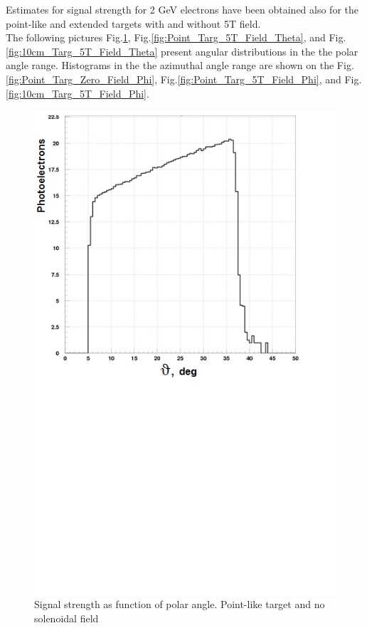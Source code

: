 Estimates for signal strength for 2 GeV electrons have been obtained also for the point-like and extended targets with and without 5T field.\\
\indent The following pictures 
Fig.\ref{fig:Point_Targ_Zero_Field_Theta}, 
Fig.\ref{fig:Point_Targ_5T_Field_Theta}, and 
Fig.\ref{fig:10cm_Targ_5T_Field_Theta} 
present angular distributions in the the polar angle range. Histograms  in the the azimuthal angle range are shown on the 
Fig.\ref{fig:Point_Targ_Zero_Field_Phi}, 
Fig.\ref{fig:Point_Targ_5T_Field_Phi}, and 
Fig.\ref{fig:10cm_Targ_5T_Field_Phi}. 

\begin{figure}[!h]
    \centering
    \includegraphics[width=1.0\linewidth,trim={0.0cm 9.4cm 0.0cm 0.0cm},clip]{images/Point_Targ_Zero_Field_Theta.jpg}
    \caption{Signal strength as function of polar angle. Point-like target and no solenoidal field}
    \label{fig:Point_Targ_Zero_Field_Theta}
\end{figure}

